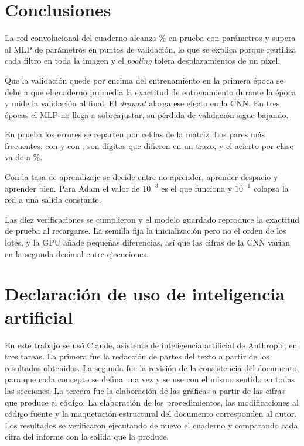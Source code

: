 \documentclass[11pt,letterpaper]{article}
\begin{document}
\section{Conclusiones}

La red convolucional del cuaderno alcanza \accTe{} \% en prueba con \paramCnn{} parámetros y supera al MLP de \paramMlp{} parámetros en \difVal{} puntos de validación, lo que se explica porque reutiliza cada filtro en toda la imagen y el \emph{pooling} tolera desplazamientos de un píxel.

Que la validación quede por encima del entrenamiento en la primera época se debe a que el cuaderno promedia la exactitud de entrenamiento durante la época y mide la validación al final. El \emph{dropout} alarga ese efecto en la CNN. En tres épocas el MLP no llega a sobreajustar, su pérdida de validación sigue bajando.

En prueba los \erroresTe{} errores se reparten por \celdasConError{} celdas de la matriz. Los pares más frecuentes, \parAA{} con \parAB{} y \parBA{} con \parBB, son dígitos que difieren en un trazo, y el acierto por clase va de \accPeor{} a \accMejor{} \%.

Con la tasa de aprendizaje se decide entre no aprender, aprender despacio y aprender bien. Para Adam el valor de $10^{-3}$ es el que funciona y $10^{-1}$ colapsa la red a una salida constante.

Las diez verificaciones se cumplieron y el modelo guardado reproduce la exactitud de prueba al recargarse. La semilla fija la inicialización pero no el orden de los lotes, y la GPU añade pequeñas diferencias, así que las cifras de la CNN varían en la segunda decimal entre ejecuciones.

\section{Declaración de uso de inteligencia artificial}

En este trabajo se usó Claude, asistente de inteligencia artificial de Anthropic, en tres tareas. La primera fue la redacción de partes del texto a partir de los resultados obtenidos. La segunda fue la revisión de la consistencia del documento, para que cada concepto se defina una vez y se use con el mismo sentido en todas las secciones. La tercera fue la elaboración de las gráficas a partir de las cifras que produce el código. La elaboración de los procedimientos, las modificaciones al código fuente y la maquetación estructural del documento corresponden al autor. Los resultados se verificaron ejecutando de nuevo el cuaderno y comparando cada cifra del informe con la salida que la produce.
\end{document}
